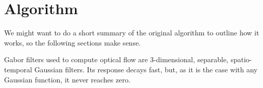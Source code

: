\newpage
\section{Algorithm}
We might want to do a short summary of the original algorithm to outline how it works, so the following sections make sense.

Gabor filters used to compute optical flow are 3-dimensional, separable, spatio-temporal Gaussian filters. Its response decays fast, but, as it is the case with any Gaussian function, it never reaches zero.